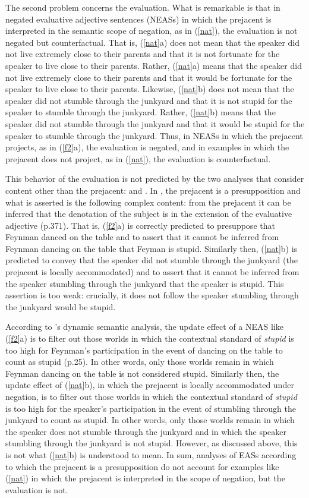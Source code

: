 \documentclass[11pt,fleqn]{article}
\newcommand{\6}{\mbox{$[\hspace*{-.6mm}[$}}
\newcommand{\9}{\mbox{$]\hspace*{-.6mm}]$}}
\newcommand{\citepos}[1]{\citeauthor{#1}'s \citeyear{#1}}
\begin{document}
The second problem concerns the evaluation. What is remarkable is that in negated evaluative adjective sentences (NEASs) in which the prejacent is interpreted in the semantic scope of negation, as in (\ref{nat}), the evaluation is not negated but counterfactual. That is, (\ref{nat}a) does not mean that the speaker did not live extremely close to their parents and that it is not fortunate for the speaker to live close to their parents. Rather, (\ref{nat}a) means that the speaker did not live extremely close to their parents and that it would be fortunate for the speaker to live close to their parents. Likewise, (\ref{nat}b) does not mean that the speaker did not stumble through the junkyard and that it is not stupid for the speaker to stumble through the junkyard. Rather, (\ref{nat}b) means that the speaker did not stumble through the junkyard and that it would be stupid for the speaker to stumble through the junkyard. Thus, in NEASs in which the prejacent projects, as in (\ref{f2}a), the evaluation is negated, and in examples in which the prejacent does not project, as in (\ref{nat}), the evaluation is counterfactual. 

This behavior of the evaluation is not predicted by the two analyses that consider content other than the prejacent: \citealt{oshima09b} and \citealt{barker02}. In \citealt{oshima09b}, the prejacent is a presupposition and what is asserted is the following complex content: from the prejacent it can be inferred that the denotation of the subject is in the extension of the evaluative adjective (p.371). That is, (\ref{f2}a) is correctly predicted to presuppose that Feynman danced on the table and to assert that it cannot be inferred from Feynman dancing on the table that Feyman is stupid. Similarly then, (\ref{nat}b) is predicted to convey that the speaker did not stumble through the junkyard (the prejacent is locally accommodated) and to assert that it cannot be inferred from the speaker stumbling through the junkyard that the speaker is stupid. This assertion is too weak: crucially, it does not follow the speaker stumbling through the junkyard would be stupid. 

According to \citepos{barker02} dynamic semantic analysis, the update effect of a NEAS like (\ref{f2}a) is to filter out those worlds in which the contextual standard of {\em stupid} is too high for Feynman's participation in the event of dancing on the table to count as stupid (p.25). In other words, only those worlds remain in which Feynman dancing on the table is not considered stupid. Similarly then, the update effect of (\ref{nat}b), in which the prejacent is locally accommodated under negation, is to filter out those worlds in which the contextual standard of {\em stupid} is too high for the speaker's participation in the event of stumbling through the junkyard to count as stupid. In other words, only those worlds remain in which the speaker does not stumble through the junkyard and in which the speaker stumbling through the junkyard is not stupid. However, as discussed above, this is not what (\ref{nat}b) is understood to mean. In sum, analyses of EASs according to which the prejacent is a presupposition do not account for examples like (\ref{nat}) in which the prejacent is interpreted in the scope of negation, but the evaluation is not. 
\end{document}
